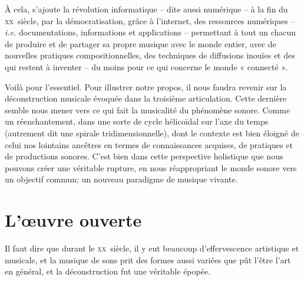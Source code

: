 \documentclass{article}
\begin{document}
À cela, s'ajoute la révolution informatique  -- dite aussi numérique --  à la fin du \textsc{xx}\ieme ~siècle,  par la démocratisation, grâce à l'internet, des ressources numériques -- \textit{i.e.} documentations, informations et applications -- permettant à tout un chacun de produire et de partager sa propre musique avec le monde entier, avec de nouvelles pratiques compositionnelles, des techniques de diffusions inouïes et des qui restent à inventer -- du moins pour ce qui concerne le monde « connecté ».


\bigskip

Voilà pour l'essentiel. Pour illustrer notre propos, il nous faudra revenir sur la déconstruction musicale évoquée dans la troisième articulation. Cette dernière semble nous mener vers ce qui fait la musicalité du phénomène sonore. Comme un réenchantement, dans une sorte de cycle hélicoïdal sur l'axe du temps (autrement dit une spirale tridimensionnelle), dont le contexte est bien éloigné de celui nos lointains ancêtres en termes de connaissances acquises, de pratiques et de productions sonores. C'est bien dans cette perspective holistique que nous pouvons créer une véritable rupture, en nous réappropriant le monde sonore vers un objectif commun; un nouveau paradigme de musique vivante.

\section*{L'œuvre ouverte}

Il faut dire que durant le \textsc{xx}\ieme ~siècle, il y eut beaucoup d'effervescence artistique et musicale, et la musique de sons prit des formes aussi variées que pût l'être l'art en général, et la déconstruction fut une véritable épopée.
\end{document}
